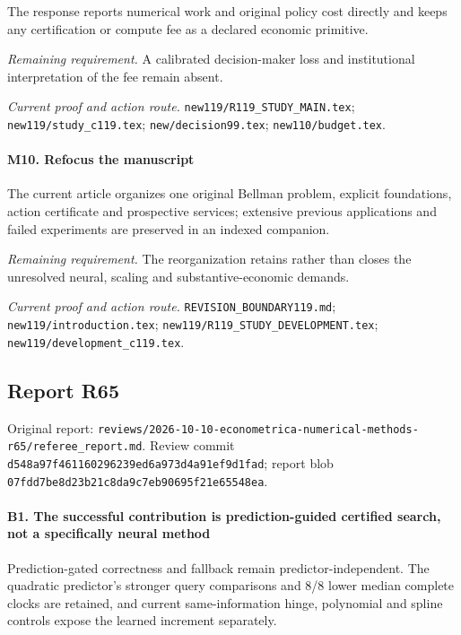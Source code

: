 The response reports numerical work and original policy cost directly and keeps any certification or compute fee as a declared economic primitive.

\par\emph{Remaining requirement.} A calibrated decision-maker loss and institutional interpretation of the fee remain absent.

\par\emph{Current proof and action route.} \nolinkurl{new119/R119_STUDY_MAIN.tex}; \nolinkurl{new119/study_c119.tex}; \nolinkurl{new/decision99.tex}; \nolinkurl{new110/budget.tex}.

\paragraph{M10. Refocus the manuscript}

The current article organizes one original Bellman problem, explicit foundations, action certificate and prospective services; extensive previous applications and failed experiments are preserved in an indexed companion.

\par\emph{Remaining requirement.} The reorganization retains rather than closes the unresolved neural, scaling and substantive-economic demands.

\par\emph{Current proof and action route.} \nolinkurl{REVISION_BOUNDARY119.md}; \nolinkurl{new119/introduction.tex}; \nolinkurl{new119/R119_STUDY_DEVELOPMENT.tex}; \nolinkurl{new119/development_c119.tex}.

\subsection{Report R65}

Original report: \nolinkurl{reviews/2026-10-10-econometrica-numerical-methods-r65/referee_report.md}. Review commit \nolinkurl{d548a97f461160296239ed6a973d4a91ef9d1fad}; report blob \nolinkurl{07fdd7be8d23b21c8da9c7eb90695f21e65548ea}.

\paragraph{B1. The successful contribution is prediction-guided certified search, not a specifically neural method}

Prediction-gated correctness and fallback remain predictor-independent. The quadratic predictor's stronger query comparisons and 8/8 lower median complete clocks are retained, and current same-information hinge, polynomial and spline controls expose the learned increment separately.

